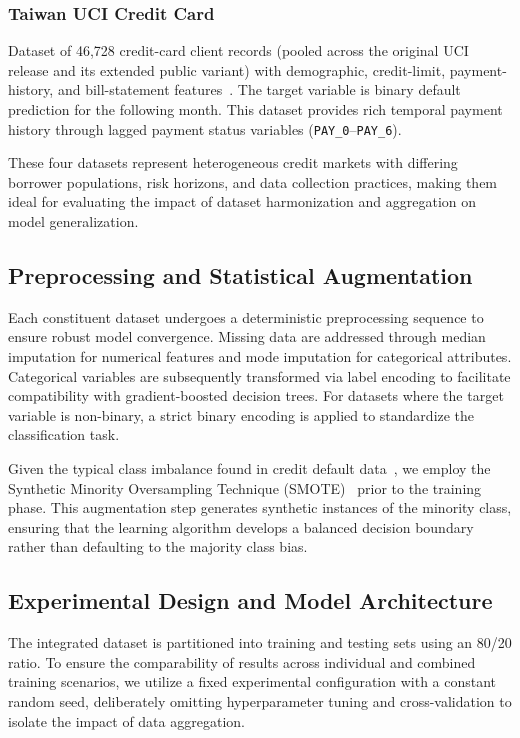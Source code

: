 \documentclass[onecolumn]{IEEEtai}
\begin{document}
\subsubsection{Taiwan UCI Credit Card} Dataset of 46{,}728 credit-card client records (pooled across the original UCI release and its extended public variant) with demographic, credit-limit, payment-history, and bill-statement features~\cite{14,22}. The target variable is binary default prediction for the following month. This dataset provides rich temporal payment history through lagged payment status variables (\texttt{PAY\_0}--\texttt{PAY\_6}).

These four datasets represent heterogeneous credit markets with differing borrower populations, risk horizons, and data collection practices, making them ideal for evaluating the impact of dataset harmonization and aggregation on model generalization.

\subsection{Preprocessing and Statistical Augmentation}\vspace{-2pt}

Each constituent dataset undergoes a deterministic preprocessing sequence to ensure robust model convergence. Missing data are addressed through median imputation for numerical features and mode imputation for categorical attributes. Categorical variables are subsequently transformed via label encoding to facilitate compatibility with gradient-boosted decision trees. For datasets where the target variable is non-binary, a strict binary encoding is applied to standardize the classification task.

Given the typical class imbalance found in credit default data~\cite{19}, we employ the Synthetic Minority Oversampling Technique (SMOTE)~\cite{13} prior to the training phase. This augmentation step generates synthetic instances of the minority class, ensuring that the learning algorithm develops a balanced decision boundary rather than defaulting to the majority class bias.

\subsection{Experimental Design and Model Architecture}\vspace{-2pt}

The integrated dataset is partitioned into training and testing sets using an 80/20 ratio. To ensure the comparability of results across individual and combined training scenarios, we utilize a fixed experimental configuration with a constant random seed, deliberately omitting hyperparameter tuning and cross-validation to isolate the impact of data aggregation.
\end{document}
